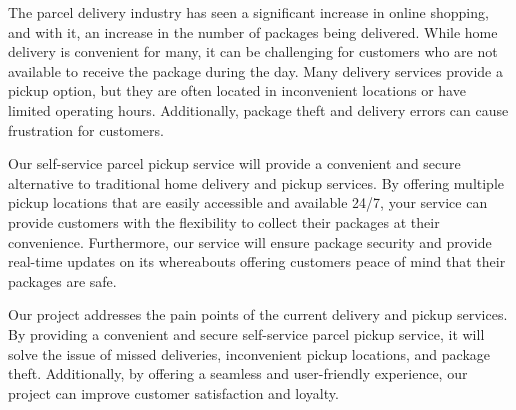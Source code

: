 \documentclass{article}
\begin{document}
The parcel delivery industry has seen a significant increase in online shopping, and with it, an increase in the number of packages being delivered. While home delivery is convenient for many, it can be challenging for customers who are not available to receive the package during the day. Many delivery services provide a pickup option, but they are often located in inconvenient locations or have limited operating hours. Additionally, package theft and delivery errors can cause frustration for customers.

Our self-service parcel pickup service will provide a convenient and secure alternative to traditional home delivery and pickup services. By offering multiple pickup locations that are easily accessible and available 24/7, your service can provide customers with the flexibility to collect their packages at their convenience. Furthermore, our service will ensure package security and provide real-time updates on its whereabouts offering customers peace of mind that their packages are safe.

Our project addresses the pain points of the current delivery and pickup services. By providing a convenient and secure self-service parcel pickup service, it will solve the issue of missed deliveries, inconvenient pickup locations, and package theft. Additionally, by offering a seamless and user-friendly experience, our project can improve customer satisfaction and loyalty.
\end{document}
